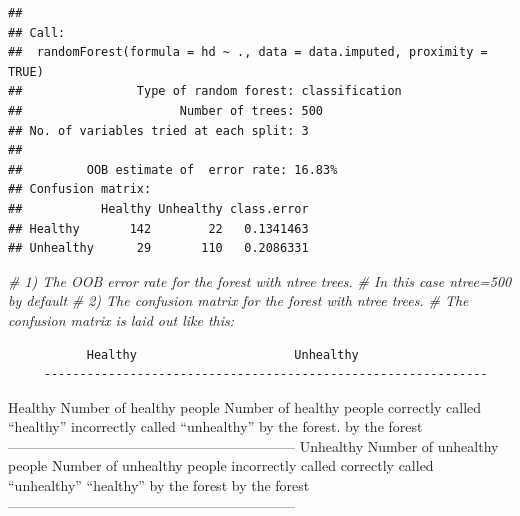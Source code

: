 \documentclass[
]{book}
\newenvironment{Shaded}{\begin{snugshade}}{\end{snugshade}}
\newcommand{\CommentTok}[1]{\textcolor[rgb]{0.56,0.35,0.01}{\textit{#1}}}
\begin{document}
\begin{verbatim}
## 
## Call:
##  randomForest(formula = hd ~ ., data = data.imputed, proximity = TRUE) 
##                Type of random forest: classification
##                      Number of trees: 500
## No. of variables tried at each split: 3
## 
##         OOB estimate of  error rate: 16.83%
## Confusion matrix:
##           Healthy Unhealthy class.error
## Healthy       142        22   0.1341463
## Unhealthy      29       110   0.2086331
\end{verbatim}

\begin{Shaded}
\begin{Highlighting}[]
      \CommentTok{\# 1) The OOB error rate for the forest with ntree trees. }
      \CommentTok{\#    In this case ntree=500 by default}
      \CommentTok{\# 2) The confusion matrix for the forest with ntree trees.}
      \CommentTok{\#    The confusion matrix is laid out like this:}
\end{Highlighting}
\end{Shaded}

\begin{verbatim}
           Healthy                      Unhealthy
     --------------------------------------------------------------
\end{verbatim}

Healthy \textbar{} Number of healthy people \textbar{} Number of healthy people \textbar{}
\textbar{} correctly called ``healthy'' \textbar{} incorrectly called ``unhealthy'' \textbar{}
\textbar{} by the forest. \textbar{} by the forest \textbar{}
--------------------------------------------------------------
Unhealthy\textbar{} Number of unhealthy people \textbar{} Number of unhealthy people \textbar{}
\textbar{} incorrectly called \textbar{} correctly called ``unhealthy'' \textbar{}
\textbar{} ``healthy'' by the forest \textbar{} by the forest \textbar{}
--------------------------------------------------------------
\end{document}
